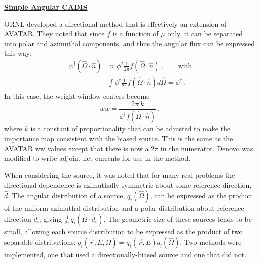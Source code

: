 \documentclass[12pt,twoside]{article}
\newcommand{\vOmega}{\ensuremath{\hat{\Omega}}}
\begin{document}
\vspace*{3em}
\begin{center}
\underline{\textbf{Simple Angular CADIS}} \cite{Peplow2012a}
\end{center}
ORNL developed a directional method that is effectively an extension of AVATAR. They noted that since $f$ is a function of $\mu$ only, it can be separated into polar and azimuthal components, and thus the angular flux can be expressed this way:
\begin{align}
  \psi^{\dagger}(\vOmega \cdot \hat{n}) &\approx \phi^{\dagger} \frac{1}{2\pi} f(\vOmega \cdot \hat{n})\:, \qquad \text{with} \\
  &\int \phi^{\dagger} \frac{1}{2\pi} f(\vOmega \cdot \hat{n}) d\vOmega =  \phi^{\dagger} \:.
\end{align}
In this case, the weight window centers become
\begin{equation}
  \boxed{ww = \frac{2 \pi \:k}{\phi^{\dagger}f(\vOmega \cdot \hat{n})}} \:,
\end{equation}
where $k$ is a constant of proportionality that can be adjusted to make the importance map consistent with the biased source. This is the same as the AVATAR ww values except that there is now a $2 \pi$ in the numerator. Denovo was modified to write adjoint net currents for use in the method.

When considering the source, it was noted that for many real problems the directional dependence is azimuthally symmetric about some reference direction, $\hat{d}$. The angular distribution of a source, $q_i(\vOmega)$, can be expressed as the product of the uniform azimuthal distribution and a polar distribution about reference direction $\hat{d}_i$, giving $\frac{1}{2\pi}q_i (\vOmega \cdot \hat{d}_i)$. The geometric size of these sources tends to be small, allowing each source distribution to be expressed as the product of two separable distributions: $q_i(\vec{r},E,\vOmega) = q_i (\vec{r},E)  q_i (\vOmega)$. Two methods were implemented, one that used a directionally-biased source and one that did not. 
\end{document}

